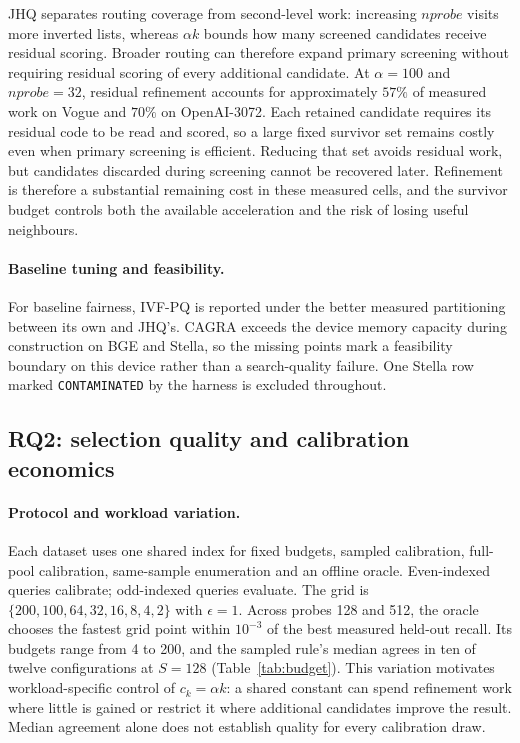 JHQ separates routing coverage from second-level work: increasing
$\mathit{nprobe}$ visits more inverted lists, whereas $\alpha k$ bounds how
many screened candidates receive residual scoring. Broader routing can
therefore expand primary screening without requiring residual scoring of every
additional candidate. At $\alpha=100$ and $\mathit{nprobe}=32$, residual
refinement accounts for approximately $57\%$ of measured work on Vogue and
$70\%$ on OpenAI-3072. Each retained candidate requires its residual code to
be read and scored, so a large fixed survivor set remains costly even when
primary screening is efficient. Reducing that set avoids residual work, but
candidates discarded during screening cannot be recovered later. Refinement is
therefore a substantial remaining cost in these measured cells, and the
survivor budget controls both the available acceleration and the risk of
losing useful neighbours.

\paragraph{Baseline tuning and feasibility.}
For baseline fairness, IVF-PQ is reported under the better measured
partitioning between its own and JHQ's. CAGRA exceeds the device memory
capacity during construction on BGE and Stella, so the missing points mark a
feasibility boundary on this device rather than a search-quality failure. One
Stella row marked \texttt{CONTAMINATED} by the harness is excluded throughout.

\subsection{RQ2: selection quality and calibration economics}
\label{sec:rq2}
\paragraph{Protocol and workload variation.}
Each dataset uses one shared index for fixed budgets, sampled calibration,
full-pool calibration, same-sample enumeration and an offline oracle.
Even-indexed queries calibrate; odd-indexed queries evaluate. The grid is
$\{200,100,64,32,16,8,4,2\}$ with $\epsilon=1$. Across probes 128 and 512, the
oracle chooses the fastest grid point within $10^{-3}$ of the best measured
held-out recall. Its budgets range from 4 to 200, and the sampled rule's
median agrees in ten of twelve configurations at $S=128$
(Table~\ref{tab:budget}). This variation motivates workload-specific control
of $c_k=\alpha k$: a shared constant can spend refinement work where little is
gained or restrict it where additional candidates improve the result. Median
agreement alone does not establish quality for every calibration draw.

